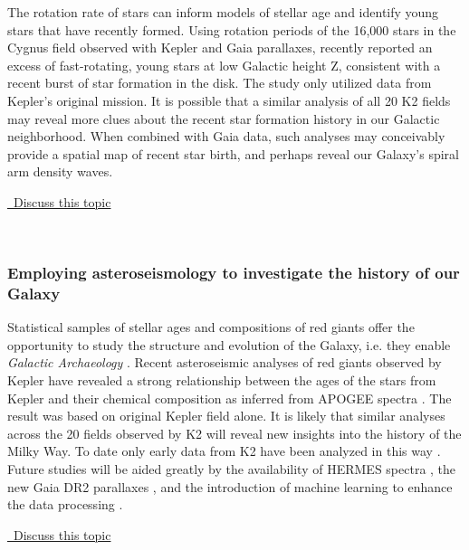 \documentclass[modern]{aastex62}
\newcommand{\commentlink}[1]{\href{https://github.com/KeplerGO/ScientificOpportunities/issues/#1}{\sc \faExternalLink\ Discuss this topic}\,\,}
\begin{document}
The rotation rate of stars can inform models of stellar age and identify young stars that have recently formed. Using rotation periods of the 16,000 stars in the Cygnus field observed with Kepler and Gaia parallaxes, \citet{davenport2018} recently reported an excess of fast-rotating, young stars at low Galactic height Z, consistent with a recent burst of star formation in the disk. The study only utilized data from Kepler's original mission. It is possible that a similar analysis of all 20 K2 fields may reveal more clues about the recent star formation history in our Galactic neighborhood.  When combined with Gaia data, such analyses may conceivably provide a spatial map of recent star birth, and perhaps reveal our Galaxy's spiral arm density waves.
\begin{center}
\commentlink{15}
\end{center}
\ \\

\subsubsection{Employing asteroseismology to investigate the history of our Galaxy}
Statistical samples of stellar ages and compositions of red giants offer the opportunity to study the structure and evolution of the Galaxy, i.e. they enable {\em Galactic Archaeology} \citep{miglio2013}.
Recent asteroseismic analyses of red giants observed by Kepler have revealed a strong relationship between the ages of the stars from Kepler and their chemical composition as inferred from APOGEE spectra \citep{aguirre2018}. The result was based on original Kepler field alone. It is likely that similar analyses across the 20 fields observed by K2 will reveal new insights into the history of the Milky Way. To date only early data from K2 have been analyzed in this way \citep{stello2017}. Future studies will be aided greatly by the availability of HERMES spectra \citep{wittenmyer2018}, the new Gaia DR2 parallaxes \citep{gaia2018}, and the introduction of machine learning to enhance the data processing \citep{hon2018}.
\\
\begin{center}
\commentlink{16}
\end{center}
\ \\
\end{document}

